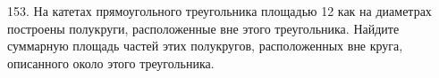 153. На катетах прямоугольного треугольника площадью 12 как на диаметрах построены полукруги, расположенные вне этого треугольника. Найдите суммарную площадь частей этих полукругов, расположенных вне круга, описанного около этого треугольника.
\begin{figure}[h]
\end{figure}\\
